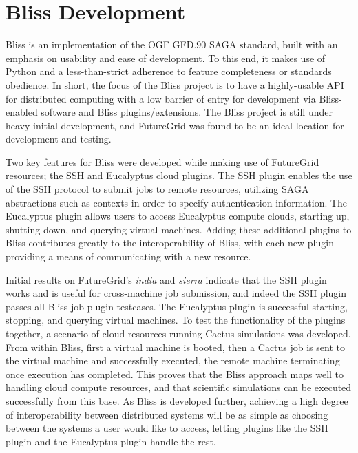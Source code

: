 \documentclass[]{paper}
\begin{document}
\section{Bliss Development}
Bliss is an implementation of the OGF GFD.90 SAGA standard, built with an emphasis
on usability and ease of development.  To this end, it makes use of Python and a
less-than-strict adherence to feature completeness or standards obedience.
In short, the focus of the Bliss project is to have a highly-usable API for distributed
computing with a low barrier of entry for development via Bliss-enabled software
and Bliss plugins/extensions.  The Bliss project is still under heavy 
initial development, and FutureGrid was found to be an ideal location for development and testing.

Two key features for Bliss were developed while making use of FutureGrid resources; 
the SSH and Eucalyptus cloud plugins.  The SSH plugin enables the use of the SSH protocol
to submit jobs to remote resources, utilizing SAGA abstractions such as contexts in order
to specify authentication information.  The Eucalyptus plugin allows users to access
Eucalyptus compute clouds, starting up, shutting down, and querying virtual machines.
Adding these additional plugins to Bliss contributes greatly to the interoperability of
Bliss, with each new plugin providing a means of communicating with a new resource.

Initial results on FutureGrid's \textit{india} and \textit{sierra} indicate that the
SSH plugin works and is useful for cross-machine
job submission, and indeed the SSH plugin passes all Bliss job plugin testcases.
The Eucalyptus plugin is successful starting, stopping, and querying virtual machines.
To test the functionality of the plugins together, a scenario of cloud resources running
Cactus simulations was developed.  From within Bliss, first a virtual machine is booted, 
then a Cactus job is sent to the virtual machine and successfully executed,
 the remote machine terminating
once execution has completed.  This proves that the Bliss approach maps well to handling
cloud compute resources, and that scientific simulations can be executed successfully from this
base.  As Bliss is developed further, achieving a high degree of interoperability
between distributed systems will be as simple as choosing between the systems a user would like
to access, letting plugins like the SSH plugin and the Eucalyptus plugin handle the rest.
\end{document}
